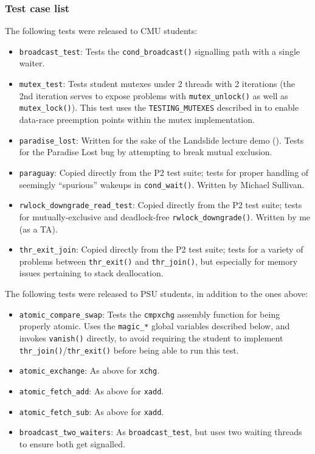 \subsubsection{Test case list}

The following tests were released to CMU students:
\begin{itemize}
	\item {\tt broadcast\_test}:
		Tests the {\tt cond\_broadcast()} signalling path with a single waiter.
	\item {\tt mutex\_test}:
		Tests student mutexes under 2 threads with 2 iterations
		(the 2nd iteration serves to expose problems with {\tt mutex\_unlock()} as well as {\tt mutex\_lock()}).
		This test uses the {\tt TESTING\_MUTEXES}
		described in \sect{\ref{sec:landslide-staticconfig}}
		to enable data-race preemption points within the mutex implementation.
	\item {\tt paradise\_lost}:
		Written for the sake of the Landslide lecture demo
		(\sect{\ref{sec:education-pebbles-recruiting}}).
		Tests for the Paradise Lost bug by attempting to break mutual exclusion.
	\item {\tt paraguay}:
		Copied directly from the P2 test suite;
		tests for proper handling of seemingly ``spurious'' wakeups in {\tt cond\_wait()}.
		Written by Michael Sullivan.
	\item {\tt rwlock\_downgrade\_read\_test}:
		Copied directly from the P2 test suite;
		tests for mutually-exclusive and deadlock-free {\tt rwlock\_downgrade()}.
		Written by me (as a TA).
	\item {\tt thr\_exit\_join}:
		Copied directly from the P2 test suite;
		tests for a variety of problems between {\tt thr\_exit()} and {\tt thr\_join()},
		but especially for memory issues pertaining to stack deallocation.
\end{itemize}
\vspace{1em}

\noindent The following tests were released to PSU students, in addition to the ones above:
\begin{itemize}
	\item {\tt atomic\_compare\_swap}:
		Tests the {\tt cmpxchg} assembly function for being properly atomic.
		Uses the {\tt magic\_*} global variables described below, and invokes {\tt vanish()} directly,
		to avoid requiring the student to implement {\tt thr\_join()}/{\tt thr\_exit()}
		before being able to run this test.
	\item {\tt atomic\_exchange}:
		As above for {\tt xchg}.
	\item {\tt atomic\_fetch\_add}:
		As above for {\tt xadd}.
	\item {\tt atomic\_fetch\_sub}:
		As above for {\tt xadd}.
	\item {\tt broadcast\_two\_waiters}:
		As {\tt broadcast\_test}, but uses two waiting threads to ensure both get signalled.
\end{itemize}
\vspace{1em}

